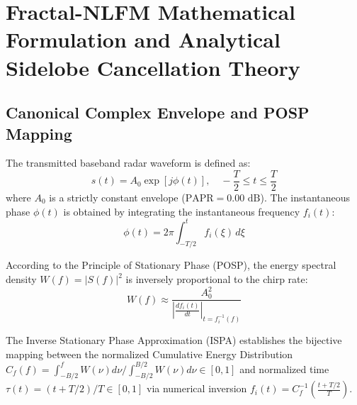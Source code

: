 \documentclass[journal,compsoc]{IEEEtran}
\begin{document}
\section{Fractal-NLFM Mathematical Formulation and Analytical Sidelobe Cancellation Theory}

\subsection{Canonical Complex Envelope and POSP Mapping}
The transmitted baseband radar waveform is defined as:
\begin{equation}
s(t) = A_0 \exp\left[j \phi(t)\right], \quad -\frac{T}{2} \le t \le \frac{T}{2}
\end{equation}
where $A_0$ is a strictly constant envelope ($\text{PAPR} = 0.00\text{ dB}$). The instantaneous phase $\phi(t)$ is obtained by integrating the instantaneous frequency $f_i(t)$:
\begin{equation}
\phi(t) = 2\pi \int_{-T/2}^{t} f_i(\xi) \, d\xi
\end{equation}

According to the Principle of Stationary Phase (POSP), the energy spectral density $W(f) = |S(f)|^2$ is inversely proportional to the chirp rate:
\begin{equation}
W(f) \approx \frac{A_0^2}{\left| \frac{d f_i(t)}{dt} \right|_{t = f_i^{-1}(f)}}
\end{equation}

The Inverse Stationary Phase Approximation (ISPA) establishes the bijective mapping between the normalized Cumulative Energy Distribution $C_f(f) = \int_{-B/2}^{f} W(\nu) d\nu / \int_{-B/2}^{B/2} W(\nu) d\nu \in [0, 1]$ and normalized time $\tau(t) = (t + T/2)/T \in [0, 1]$ via numerical inversion $f_i(t) = C_f^{-1}\left(\frac{t + T/2}{T}\right)$.
\end{document}
